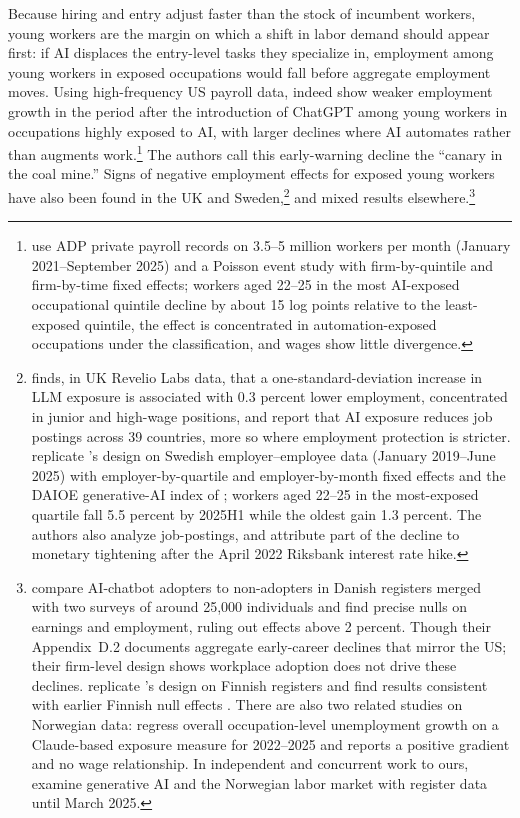 \documentclass[12pt]{article}
\begin{document}
Because hiring and entry adjust faster than the stock of incumbent workers, young workers are the margin on which a shift in labor demand should appear first: if AI displaces the entry-level tasks they specialize in, employment among young workers in exposed occupations would fall before aggregate employment moves. Using high-frequency US payroll data, \citet{brynjolfsson2025} indeed show weaker employment growth in the period after the introduction of ChatGPT among young workers in occupations highly exposed to AI, with larger declines where AI automates rather than augments work.\footnote{\citet{brynjolfsson2025} use ADP private payroll records on 3.5--5 million workers per month (January 2021--September 2025) and a Poisson event study with firm-by-quintile and firm-by-time fixed effects; workers aged 22--25 in the most AI-exposed occupational quintile decline by about 15 log points relative to the least-exposed quintile, the effect is concentrated in automation-exposed occupations under the \citet{handa2025} classification, and wages show little divergence.} The authors call this early-warning decline the ``canary in the coal mine.'' 
Signs of negative employment effects for exposed young workers have also been found in the UK and Sweden,\footnote{\citet{teeselink2025} finds, in UK Revelio Labs data, that a one-standard-deviation increase in LLM exposure is associated with 0.3 percent lower employment, concentrated in junior and high-wage positions, and \citet{teeselink2026} report that AI exposure reduces job postings across 39 countries, more so where employment protection is stricter. \citet{lodefalk2026} replicate \citet{brynjolfsson2025}'s design on Swedish employer--employee data (January 2019--June 2025) with employer-by-quartile and employer-by-month fixed effects and the DAIOE generative-AI index of \citet{engberg2024}; workers aged 22--25 in the most-exposed quartile fall 5.5 percent by 2025H1 while the oldest gain 1.3 percent. The authors also analyze job-postings, and attribute part of the decline to monetary tightening after the April 2022 Riksbank interest rate hike.} 
and mixed results elsewhere.\footnote{\citet{humlum2026} compare AI-chatbot adopters to non-adopters in Danish registers merged with two surveys of around 25,000 individuals and find precise nulls on earnings and employment, ruling out effects above 2 percent. Though their Appendix~D.2 documents aggregate early-career declines that mirror the US; their firm-level design shows workplace adoption does not drive these declines. \citet{kauhanen2026} replicate \citet{brynjolfsson2025}'s design on Finnish registers and find results consistent with earlier Finnish null effects \citep{kauhanen2024, kauhanen2025}. There are also two related studies on Norwegian data: \citet{menon2026} regress overall occupation-level unemployment growth on a Claude-based exposure measure for 2022--2025 and reports a positive gradient and no wage relationship. In independent and concurrent work to ours, \citet{facius2026labor} examine generative AI and the Norwegian labor market with register data until March 2025.}
\end{document}

